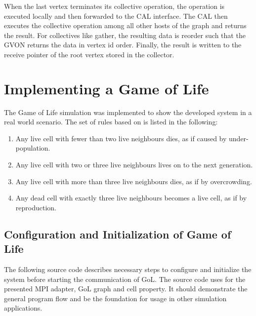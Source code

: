 When the last vertex terminates its collective operation, the
operation is executed locally and then forwarded to the CAL
interface. The CAL then executes the collective operation among all
other hosts of the graph and returns the result. For collectives like
gather, the resulting data is reorder such that the GVON returns the
data in vertex id order. Finally, the result is written to the receive
pointer of the root vertex stored in the collector.



\section{Implementing a Game of Life}
The Game of Life simulation was implemented to show the developed
system in a real world scenario. The set of rules based on \cite{ref:gol_rules}
is listed in the following:

\begin{enumerate}
\item Any live cell with fewer than two live neighbours dies, as if caused by under-population.
\item Any live cell with two or three live neighbours lives on to the next generation.
\item Any live cell with more than three live neighbours dies, as if by overcrowding.
\item Any dead cell with exactly three live neighbours becomes a live cell, as if by reproduction.
\end{enumerate}

\subsection{Configuration and Initialization of Game of Life}
The following source code describes necessary steps to configure and
initialize the system before starting the communication of GoL. The
source code uses for the presented MPI adapter, GoL graph and
cell property. It should demonstrate the general program flow and be
the foundation for usage in other simulation applications.

